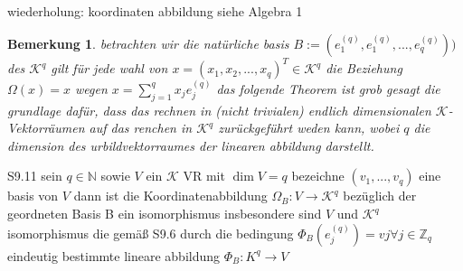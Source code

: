 \documentclass[11pt]{article}
\newtheorem{bemerkung}{Bemerkung}
\begin{document}
wiederholung: koordinaten abbildung siehe Algebra 1
\begin{bemerkung}
 betrachten wir die natürliche basis $B:= (e^{(q)}_1,e^{(q)}_1,...,e^{(q)}_q) )$ des $\mathcal{K}^q$ gilt für jede wahl von $x=(x_1,x_2,...,x_q)^T  \in \mathcal{K}^q$ die Beziehung $\Omega(x) =x$ wegen $x= \sum_{j=1}^q x_j e_j^{(q)}$
das folgende Theorem ist grob gesagt die grundlage dafür, dass das rechnen in (nicht trivialen) endlich dimensionalen $\mathcal{K}$-Vektorräumen auf das renchen in $\mathcal{K}^q$ zurückgeführt weden kann, wobei $q$ die dimension des urbildvektorraumes der linearen abbildung darstellt.
\end{bemerkung}

S9.11
sein $q \in \mathbb{N}$ sowie $V$ ein $\mathcal{K}$ VR mit $\dim V = q$ bezeichne $(v_1,...,v_q)$ eine basis von $V$ dann ist die Koordinatenabbildung $\Omega_B: V\rightarrow \mathcal{K}^q$ bezüglich der geordneten
Basis B ein isomorphismus insbesondere sind $V$ und $\mathcal{K}^q$
isomorphismus die gemäß S9.6 durch die bedingung $\Phi_B (e_j^{(q)})=vj \forall j \in \mathbb{Z}_q$ eindeutig bestimmte lineare abbildung $\Phi _B: K^q\rightarrow V$
\end{document}
